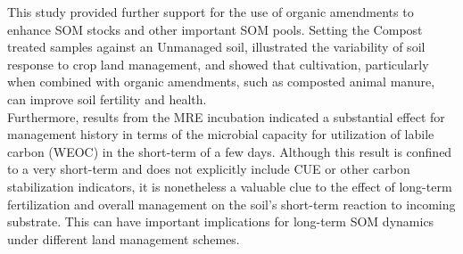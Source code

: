 	This study provided further support for the use of organic amendments to enhance SOM stocks and other important SOM pools. Setting the Compost treated samples against an Unmanaged soil, illustrated the variability of soil response to crop land management, and showed that cultivation, particularly when combined with organic amendments, such as composted animal manure, can improve soil fertility and health.\\
	Furthermore, results from the MRE incubation indicated a substantial effect for management history in terms of the microbial capacity for utilization of labile carbon (WEOC) in the short-term of a few days. Although this result is confined to a very short-term and does not explicitly include CUE or other carbon stabilization indicators, it is nonetheless a valuable clue to the effect of long-term fertilization and overall management on the soil's short-term reaction to incoming substrate. This can have important implications for long-term SOM dynamics under different land management schemes.  
	         
	
	
     